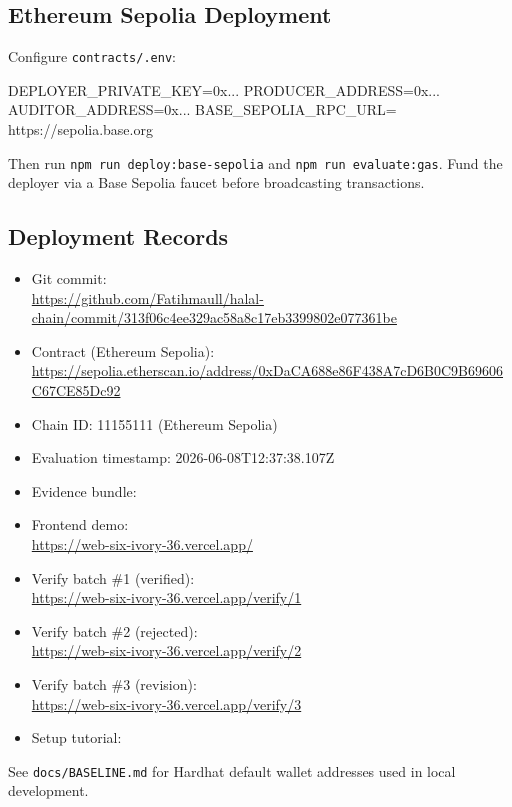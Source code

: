 \subsection{Ethereum Sepolia Deployment}
Configure \texttt{contracts/.env}:
\begin{Code}
DEPLOYER_PRIVATE_KEY=0x...
PRODUCER_ADDRESS=0x...
AUDITOR_ADDRESS=0x...
BASE_SEPOLIA_RPC_URL=
  https://sepolia.base.org
\end{Code}
Then run \texttt{npm run deploy:base-sepolia} and \texttt{npm run evaluate:gas}.
Fund the deployer via a Base Sepolia faucet before broadcasting transactions.

\subsection{Deployment Records}
\begin{itemize}
  \item Git commit:\\
  \url{https://github.com/Fatihmaull/halal-chain/commit/313f06c4ee329ac58a8c17eb3399802e077361be}
  \item Contract (Ethereum Sepolia):\\
  \url{https://sepolia.etherscan.io/address/0xDaCA688e86F438A7cD6B0C9B69606C67CE85Dc92}
  \item Chain ID: 11155111 (Ethereum Sepolia)
  \item Evaluation timestamp: 2026-06-08T12:37:38.107Z
  \item Evidence bundle: 
  \item Frontend demo:\\
  \url{https://web-six-ivory-36.vercel.app/}
  \item Verify batch \#1 (verified):\\
  \url{https://web-six-ivory-36.vercel.app/verify/1}
  \item Verify batch \#2 (rejected):\\
  \url{https://web-six-ivory-36.vercel.app/verify/2}
  \item Verify batch \#3 (revision):\\
  \url{https://web-six-ivory-36.vercel.app/verify/3}
  \item Setup tutorial: 
\end{itemize}

See \texttt{docs/BASELINE.md} for Hardhat default wallet addresses used in local development.

